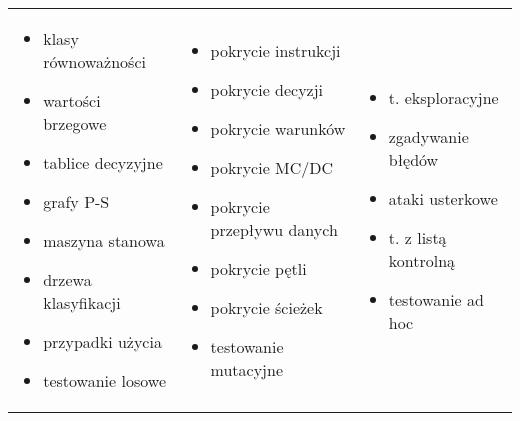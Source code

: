 \documentclass[../main.tex]{subfiles}
\begin{document}
\begin{table}[H]
\begin{center}
\begin{tabular}{ p{5cm} p{5cm} p{5cm} }
                \begin{itemize}
                    \item klasy równoważności
                    \item wartości brzegowe
                    \item tablice decyzyjne
                    \item grafy P-S
                    \item maszyna stanowa
                    \item drzewa klasyfikacji
                    \item przypadki użycia
                    \item testowanie losowe
                \end{itemize}
                &
                \begin{itemize}
                    \item pokrycie instrukcji
                    \item pokrycie decyzji
                    \item pokrycie warunków
                    \item pokrycie MC/DC
                    \item pokrycie przepływu danych
                    \item pokrycie pętli
                    \item pokrycie ścieżek
                    \item testowanie mutacyjne
                \end{itemize}
                &
                \begin{itemize}
                    \item t. eksploracyjne
                    \item zgadywanie błędów
                    \item ataki usterkowe
                    \item t. z listą kontrolną
                    \item testowanie ad hoc
                \end{itemize}\\
            \end{tabular}
        \end{center}
    \end{table}
\end{document}
